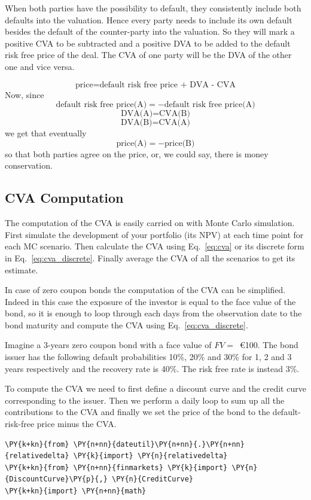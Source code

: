 \begin{codebox}
When both parties have the possibility to default, they
consistently include both defaults into the valuation. Hence
every party needs to include its own default besides the default of the
counter-party into the valuation. So they will mark a positive
CVA to be subtracted and a positive DVA to be added to the default
risk free price of the deal. The CVA of one party will be the DVA of
the other one and vice versa.

\[
\textrm{price}=\textrm{default risk free price + DVA - CVA}
\]
Now, since
\[
\textrm{default risk free price(A)} = - \textrm{default risk free price(A)}
\]
\[
\textrm{DVA(A)} = \textrm{CVA(B)}
\]
\[
\textrm{DVA(B)} = \textrm{CVA(A)}
\]
we get that eventually
\[
\textrm{price(A)} = -\textrm{price(B)}
\]
so that both parties agree on the price, or, we could say, there is money
conservation.

\subsection{CVA Computation}

The computation of the CVA is easily carried on with Monte Carlo simulation.
First simulate the development of your portfolio (its NPV) at each time point for each MC scenario. 
Then calculate the CVA using Eq.~\ref{eq:cva} or its discrete form in Eq.~\ref{eq:cva_discrete}.
Finally average the CVA of all the scenarios to get its estimate.

In case of zero coupon bonds the computation of the CVA can be simplified. Indeed in this case the exposure of the investor is equal to the face value of the bond, so it is enough to loop through each days from the observation date to the bond maturity and compute the CVA using Eq.~\ref{eq:cva_discrete}.

Imagine a 3-years zero coupon bond with a face value of $FV=$~\euro{100}. 
The bond issuer has the following default probabilities 10\%, 20\% and 30\% for 1, 2 and 3 years respectively and the recovery rate is 40\%. The risk free rate is instead 3\%. 

To compute the CVA we need to first define a discount curve and the credit curve corresponding to the issuer. Then we perform a daily loop to sum up all the contributions to the CVA and finally we set the price of the bond to the default-risk-free price minus the CVA.

\begin{codebox}
\begin{Verbatim}[commandchars=\\\{\}]
\PY{k+kn}{from} \PY{n+nn}{dateutil}\PY{n+nn}{.}\PY{n+nn}{relativedelta} \PY{k}{import} \PY{n}{relativedelta}
\PY{k+kn}{from} \PY{n+nn}{finmarkets} \PY{k}{import} \PY{n}{DiscountCurve}\PY{p}{,} \PY{n}{CreditCurve}
\PY{k+kn}{import} \PY{n+nn}{math}
		

\end{Verbatim}
\end{codebox}
\end{codebox}
